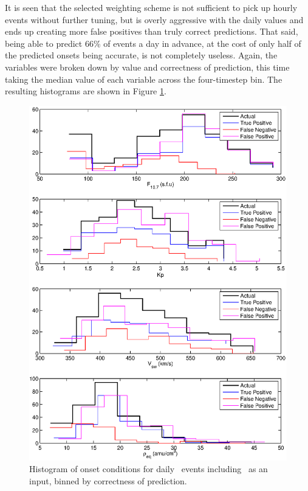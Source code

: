It is seen that the selected weighting scheme is not sufficient to pick up hourly events without further tuning, but is overly aggressive with the daily values and ends up creating more false positives than truly correct predictions. That said, being able to predict 66\% of events a day in advance, at the cost of only half of the predicted onsets being accurate, is not completely useless. Again, the variables were broken down by value and correctness of prediction, this time taking the median value of each variable across the four-timestep bin. The resulting histograms are shown in Figure \ref{fig:OnsetWithreq-hist-full}.

\begin{figure}[htp!]
	\centering
	\includegraphics[width=1\linewidth]{Figures/CH5/NNBinaryOnset-full-daily-withreq-hist.eps}
	\caption{Histogram of onset conditions for daily \req\ events including \req\ as an input, binned by correctness of prediction.}
	\label{fig:OnsetWithreq-hist-full}
\end{figure}

